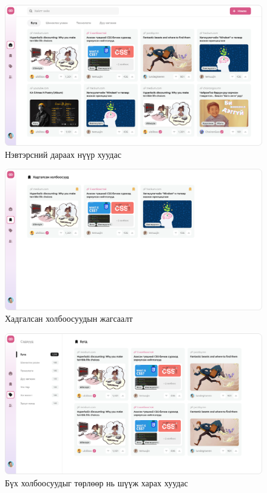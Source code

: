 \begin{figure}[h]
	\centering
	\includegraphics[width=15cm]{images/interfaces/home-screen.png}
	\caption{Нэвтэрсний дараах нүүр хуудас}
	\label{fig:homescreen}
\end{figure}

\begin{figure}[h]
	\centering
	\includegraphics[width=15cm]{images/interfaces/bookmark.png}
	\caption{Хадгалсан холбоосуудын жагсаалт}
	\label{fig:bookmark}
\end{figure}

\begin{figure}[h]
	\centering
	\includegraphics[width=15cm]{images/interfaces/topics.png}
	\caption{Бүх холбоосуудыг төрлөөр нь шүүж харах хуудас}
	\label{fig:topics}
\end{figure}

